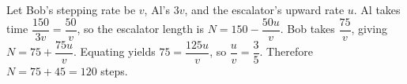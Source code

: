 Let Bob's stepping rate be $v$, Al's $3v$, and the escalator's upward rate $u$. Al takes time $\dfrac{150}{3v}=\dfrac{50}{v}$, so the escalator length is $N=150-\dfrac{50u}{v}$. Bob takes $\dfrac{75}{v}$, giving $N=75+\dfrac{75u}{v}$. Equating yields $75=\dfrac{125u}{v}$, so $\dfrac{u}{v}=\dfrac{3}{5}$. Therefore $N=75+45=\boxed{120}$ steps.
